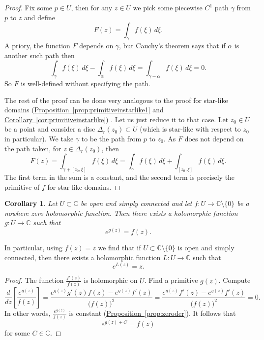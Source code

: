 \documentclass[12pt,openany]{book}
\newcommand{\C}{{\mathbb{C}}}
\theoremstyle{plain}
\newtheorem{cor}[thm]{Corollary}
\theoremstyle{remark}
\theoremstyle{definition}
\theoremstyle{exercise}
\theoremstyle{example}
\newcommand{\propref}[1]{\hyperref[#1]{Proposition~\ref*{#1}}}
\newcommand{\corref}[1]{\hyperref[#1]{Corollary~\ref*{#1}}}
\begin{document}
\begin{proof}
Fix some $p \in U$, then for any $z \in U$ we pick
some piecewise $C^1$ path $\gamma$ from $p$ to $z$
and define
\begin{equation*}
F(z) = \int_\gamma f(\xi) \, d\xi .
\end{equation*}
A priory, the function $F$ depends on $\gamma$, but Cauchy's
theorem says that if $\alpha$ is another such path then
\begin{equation*}
\int_\gamma f(\xi) \, d\xi -
\int_\alpha f(\xi) \, d\xi 
=
\int_{\gamma-\alpha} f(\xi) \, d\xi  =  0 .
\end{equation*}
So $F$ is well-defined without specifying the path.

The rest of the proof can be done very analogous to the proof for star-like
domains (\propref{prop:primitiveinstarlike1} and
\corref{cor:primitiveinstarlike}) .  Let us just reduce it to that case.
Let $z_0 \in U$ be a point and consider a disc $\Delta_r(z_0) \subset U$
(which is star-like with respect to $z_0$ in particular).
We take $\gamma$ to be the path from $p$ to $z_0$.
As $F$ does not depend on the path taken, for $z \in \Delta_r(z_0)$,
then
\begin{equation*}
F(z) =
\int_{\gamma+[z_0,\xi]} f(\xi) \, d\xi
=
\int_{\gamma} f(\xi) \, d\xi
+
\int_{[z_0,\xi]} f(\xi) \, d\xi .
\end{equation*}
The first term in the sum is a constant, and the second term is precisely
the primitive of $f$ for star-like domains.
\end{proof}

\begin{cor}
Let $U \subset \C$ be open and simply connected and
let $f \colon U \to \C \setminus \{ 0 \}$ be a nowhere zero holomorphic
function.  Then there exists a holomorphic function $g \colon U \to \C$
such that
\begin{equation*}
e^{g(z)} = f(z) .
\end{equation*}
\end{cor}

In particular, using $f(z) = z$ we find that if
$U \subset \C \setminus \{ 0 \}$ is open and simply connected, then
there exists a holomorphic function $L \colon U \to \C$ such that
\begin{equation*}
e^{L(z)} = z .
\end{equation*}

\begin{proof}
The function $\frac{f'(z)}{f(z)}$ is holomorphic on $U$.
Find a primitive $g(z)$.  Compute
\begin{equation*}
\frac{d}{dz} \left[ \frac{e^{g(z)}}{f(z)} \right] =
\frac{ e^{g(z)} g'(z) f(z) - e^{g(z)} f'(z) }{{\bigl(f(z)\bigr)}^2}
=
\frac{ e^{g(z)} f'(z) - e^{g(z)} f'(z) }{{\bigl(f(z)\bigr)}^2}
=
0 .
\end{equation*}
In other words, $\frac{e^{g(z)}}{f(z)}$ is constant
(\propref{prop:zeroder}).  It follows that
\begin{equation*}
e^{g(z) + C} = f(z)
\end{equation*}
for some $C \in \C$.
\end{proof}
\end{document}
